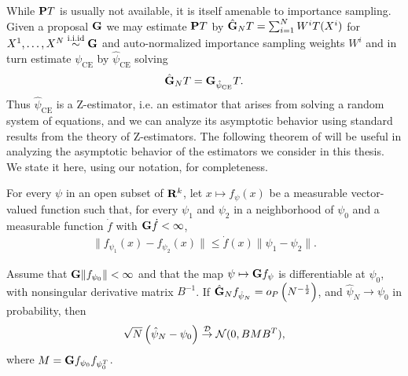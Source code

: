 While $\P T$ is usually not available, it is itself amenable to importance sampling. Given a proposal $\G$ we may estimate $\P T$ by $\hat\G_N T = \sum_{i = 1}^{N} W^{i} T(X^{i})$ for $X^{1}, \dots, X^{N} \iid \G$ and auto-normalized importance sampling weights $W^{i}$ and in turn estimate $\psi_{\text{CE}}$ by $\hat \psi_{\text{CE}}$ solving
$$
\hat \G_N T = \G_{\hpce} T.
$$
Thus $\hat\psi_{\text{CE}}$ is a Z-estimator, i.e. an estimator that arises from solving a random system of equations, and we can analyze its asymptotic behavior using standard results from the theory of Z-estimators. 
The following theorem of \citep{VanderVaart2000Asymptotic} will be useful in analyzing the asymptotic behavior of the estimators we consider in this thesis. We state it here, using our notation, for completeness.

\begin{theorem}
    \label{thm:clt_z_est_vdv}
    For every $\psi$ in an open subset of $\R^{k}$, let $x \mapsto f_{\psi}(x)$ be a measurable vector-valued function such that, for every $\psi_{1}$ and $\psi_{2}$ in a neighborhood of $\psi_{0}$ and a measurable function $\dot f$ with $\G \dot f < \infty$,
    \begin{align}
    \label{eq:clt-vdv-local-lipschitz}
    \lVert f_{\psi_{1}}(x) - f_{\psi_{2}}(x)\rVert \leq \dot f(x) \lVert \psi_{1} - \psi_{2}\rVert \tag{LL}.
    \end{align}

    Assume that $\G \lVert f_{\psi_{0}}\rVert < \infty$ and that the map $\psi \mapsto \G f_{\psi}$ is differentiable at $\psi_{0}$, with nonsingular derivative matrix $B^{-1}$. If $\hat\G_{N} f_{\hat\psi_{N}} = o_{P} \left( N^{-\frac{1}{2}} \right)$, and $\hat\psi_{N} \to \psi_{0}$ in probability, then
    \begin{align}
        \label{eq:clt-vdv}
        \sqrt{N} \left( \hat\psi_{N} - \psi_{0} \right) \Dto \mathcal N(0, BMB^{T}),
    \end{align}
    where $M = \G f_{\psi_{0}} f_{\psi_{0}^{T}}$.
\end{theorem}

